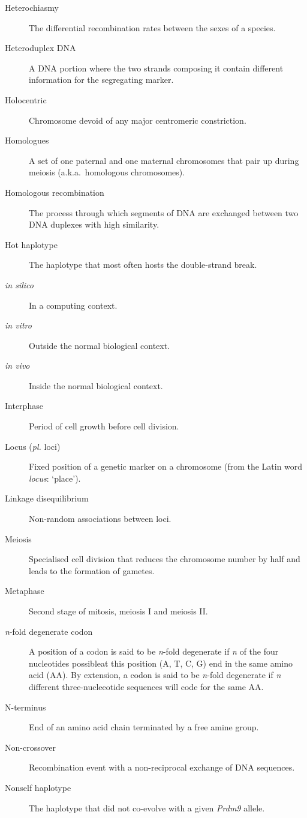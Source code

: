 \begin{alwayssingle}
\begin{description}
		\item[Heterochiasmy] The differential recombination rates between the sexes of a species.
		\item[Heteroduplex DNA] A DNA portion where the two strands composing it contain different information for the segregating marker.
		\item[Holocentric] Chromosome devoid of any major centromeric constriction. 
		\item[Homologues] A set of one paternal and one maternal chromosomes that pair up during meiosis (a.k.a.\ homologous chromosomes).
		\item[Homologous recombination] The process through which segments of DNA are exchanged between two DNA duplexes with high similarity.
		\item[Hot haplotype] The haplotype that most often hosts the double-strand break.
		\item[\textit{in silico}] In a computing context.
		\item[\textit{in vitro}] Outside the normal biological context.
		\item[\textit{in vivo}] Inside the normal biological context.
		\item[Interphase] Period of cell growth before cell division.
		\item[Locus (\textit{pl.} loci)] Fixed position of a genetic marker on a chromosome (from the Latin word \textit{locus}: ‘place’).
		\item[Linkage disequilibrium] Non-random associations between loci.
		\item[Meiosis] Specialised cell division that reduces the chromosome number by half and leads to the formation of gametes.
		\item[Metaphase] Second stage of mitosis, meiosis I and meiosis II\@.
		\item[\textit{n}-fold degenerate codon] A position of a codon is said to be \textit{n}-fold degenerate if \textit{n} of the four nucleotides possibleat this position (A, T, C, G) end in the same amino acid (AA). By extension, a codon is said to be \textit{n}-fold degenerate if \textit{n} different three-nucleeotide sequences will code for the same AA\@.
		\item[N-terminus] End of an amino acid chain terminated by a free amine group.
		\item[Non-crossover] Recombination event with a non-reciprocal exchange of DNA sequences.
		\item[Nonself haplotype] The haplotype that did not co-evolve with a given \textit{Prdm9} allele.

\end{description}
\end{alwayssingle}
